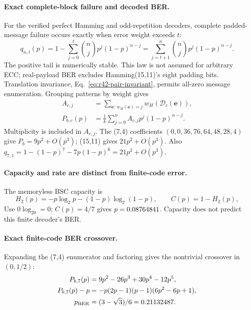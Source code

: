 \paragraph{Exact complete-block failure and decoded BER.}
For the verified perfect Hamming and odd-repetition decoders, complete
padded-message failure occurs exactly when error weight exceeds $t$:
\begin{equation}
 q_{n,t}(p)=1-\sum_{j=0}^t\binom njp^j(1-p)^{n-j}
 =\sum_{j=t+1}^n\binom njp^j(1-p)^{n-j}.
 \label{eq:r32-bler}
\end{equation}
The positive tail is numerically stable. This law is not assumed for
arbitrary ECC; real-payload BER excludes Hamming(15,11)'s eight padding bits.
Translation invariance, Eq.~\eqref{eq:r42-pair-invariant}, permits all-zero
message enumeration. Grouping patterns by weight gives
\begin{equation}
 \begin{aligned}
 A_{c,j}&=\sum_{\mathbf e:\,w_H(\mathbf e)=j}w_H(\mathcal D_c(\mathbf e)),\\
 P_{b,c}(p)&=\frac1k\sum_{j=0}^n A_{c,j}p^j(1-p)^{n-j}.
 \end{aligned}
 \label{eq:r32-exactber}
\end{equation}
Multiplicity is included in $A_{c,j}$. The (7,4) coefficients
$(0,0,36,76,64,48,28,4)$ give $P_b=9p^2+O(p^3)$; (15,11) gives
$21p^2+O(p^3)$. Also $q_{7,1}=1-(1-p)^7-7p(1-p)^6=21p^2+O(p^3)$.

\paragraph{Capacity and rate are distinct from finite-code error.}
The memoryless BSC capacity is
\begin{equation}
 H_2(p)=-p\log_2p-(1-p)\log_2(1-p),\qquad C(p)=1-H_2(p),
 \label{eq:r33-capacity}
\end{equation}
Use $0\log_20=0$; $C(p)=4/7$ gives $p=0.08764841$.
Capacity does not predict this finite decoder's BER.

\paragraph{Exact finite-code BER crossover.}
Expanding the (7,4) enumerator and factoring gives the nontrivial
crossover in $(0,1/2)$:
\begin{align}
 P_{b,7}(p)&=9p^2-26p^3+30p^4-12p^5,\nonumber\\
 P_{b,7}(p)-p&=-p(2p-1)(p-1)(6p^2-6p+1),\label{eq:r33-bercross}\\
 p_{\rm BER}&=(3-\sqrt3)/6=0.21132487.\label{eq:r33-berroot}
\end{align}

